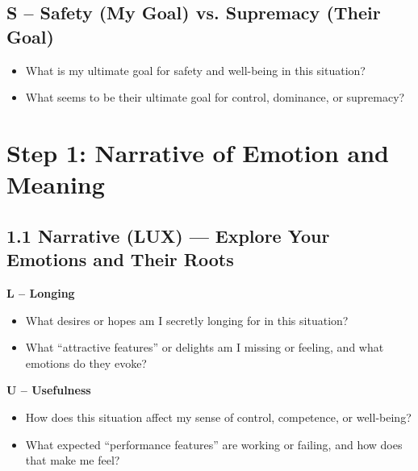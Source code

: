 \documentclass[11pt]{article}
\begin{document}
\subsection*{S – Safety (My Goal) vs. Supremacy (Their Goal)}

\begin{itemize}[noitemsep]
  \item What is my ultimate goal for safety and well-being in this situation?
  \item What seems to be their ultimate goal for control, dominance, or supremacy?
\end{itemize}
\begin{answerbox}
\vspace{4em}
\end{answerbox}

\section{Step 1: Narrative of Emotion and Meaning}

\subsection*{1.1 Narrative (LUX) --- Explore Your Emotions and Their Roots}

\textbf{L – Longing}

\begin{itemize}[noitemsep]
  \item What desires or hopes am I secretly longing for in this situation?
  \item What “attractive features” or delights am I missing or feeling, and what emotions do they evoke?
\end{itemize}
\begin{answerbox}
\vspace{3em}
\end{answerbox}

\textbf{U – Usefulness}

\begin{itemize}[noitemsep]
  \item How does this situation affect my sense of control, competence, or well-being?
  \item What expected “performance features” are working or failing, and how does that make me feel?
\end{itemize}
\begin{answerbox}
\vspace{3em}
\end{answerbox}
\end{document}

